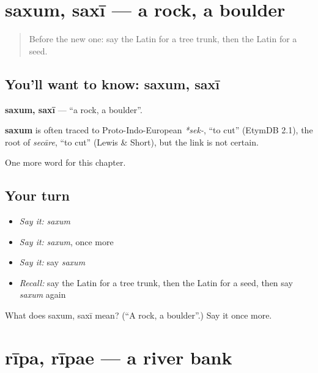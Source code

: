 \section[saxum, saxī]{saxum, saxī — a rock, a boulder}

\label{lesson:LA-C129-saxum}



\begin{quote}
Before the new one: say the Latin for a tree trunk, then the Latin for a seed.
\end{quote}

\subsection*{You'll want to know: saxum, saxī}
\textbf{saxum, saxī} — \textquotedblleft{}a rock, a boulder\textquotedblright{}.

\begin{cousinweb}
\textbf{saxum} is often traced to Proto-Indo-European \emph{*sek-}, \textquotedblleft{}to cut\textquotedblright{} (EtymDB 2.1), the root of \emph{secāre}, \textquotedblleft{}to cut\textquotedblright{} (Lewis \& Short), but the link is not certain.
\end{cousinweb}

\begin{grammarlens}[title={What you've built}]
One more word for this chapter.
\end{grammarlens}

\subsection*{Your turn}
\begin{itemize}
\raggedright
  \item \emph{Say it:} \emph{saxum}
  \item \emph{Say it:} \emph{saxum}, once more
  \item \emph{Say it:} say \emph{saxum}
  \item \emph{Recall:} say the Latin for a tree trunk, then the Latin for a seed, then say \emph{saxum} again
\end{itemize}

\begin{tcolorbox}[breakable,colback=teal!4,colframe=teal!35!black,title={Before you move on}]
What does saxum, saxī mean? (\textquotedblleft{}A rock, a boulder\textquotedblright{}.) Say it once more.
\end{tcolorbox}
\section[rīpa, rīpae]{rīpa, rīpae — a river bank}

